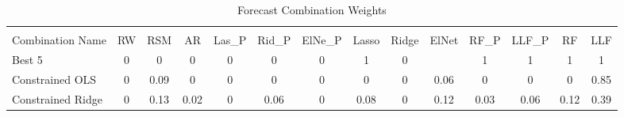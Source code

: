 \begin{table}[!h]
\centering
\caption{\label{tab:forecast_combination_weights}Forecast Combination Weights}
\fontsize{8}{10}\selectfont
\begin{tabular}[t]{lccccccccccccc}
\toprule
{} & 
 &  &   &  &  \\
\cmidrule(l{3pt}r{3pt}){2-4} \cmidrule(l{3pt}r{3pt}){5-7} \cmidrule(l{3pt}r{3pt}){8-10} \cmidrule(l{3pt}r{3pt}){11-12} \cmidrule(l{3pt}r{3pt}){13-14}
Combination Name & RW & RSM & AR & Las\_P & Rid\_P & ElNe\_P & Lasso & Ridge & ElNet & RF\_P & LLF\_P & RF & LLF\\
\midrule
Best 5 & 0 & 0 & 0 & 0 & 0 & 0 & 1 & 0 &  & 1 & 1 & 1 & 1\\
Constrained OLS & 0 & 0.09 & 0 & 0 & 0 & 0 & 0 & 0 & 0.06 & 0 & 0 & 0 & 0.85\\
Constrained Ridge & 0 & 0.13 & 0.02 & 0 & 0.06 & 0 & 0.08 & 0 & 0.12 & 0.03 & 0.06 & 0.12 & 0.39\\
\bottomrule\bottomrule
\end{tabular}
\end{table}